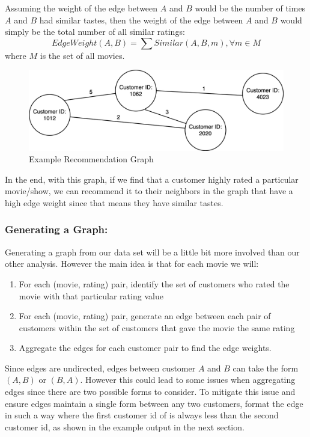 \documentclass{article}
\begin{document}
\noindent Assuming the weight of the edge between $A$ and $B$ would be the number of times $A$ and $B$ had similar tastes, then the weight of the edge between $A$ and $B$ would simply be the total number of all similar ratings:
\vspace{0.1cm}
$$EdgeWeight(A,B) = \sum Similar(A,B,m), \forall m \in M$$
\vspace{0.1cm}
where $M$ is the set of all movies.\\

\begin{figure}[hbt!]
\vspace{-0.0cm}
\centering
\includegraphics[width=12cm]{images/recgraph.png}
\vspace{-0.0cm}
\caption{Example Recommendation Graph}
\label{fig:recgraph}
\end{figure}



\noindent In the end, with this graph, if we find that a customer highly rated a particular movie/show, we can recommend it to their neighbors in the graph that have a high edge weight since that means they have similar tastes. 



\subsubsection*{Generating a Graph:}
Generating a graph from our data set will be a little bit more involved than our other analysis. However the main idea is that for each movie we will:
\begin{enumerate}
    \item For each (movie, rating) pair, identify the set of customers who rated the movie with that particular rating value
    \item For each (movie, rating) pair, generate an edge between each pair of customers within the set of customers that gave the movie the same rating
    \item Aggregate the edges for each customer pair to find the edge weights. 
\end{enumerate}
\begin{info}
Since edges are undirected, edges between customer $A$ and $B$ can take the form $(A,B)$ or $(B,A)$. However this could lead to some issues when aggregating edges since there are two possible forms to consider. To mitigate this issue and ensure edges maintain a single form between any two customers, format the edge in such a way where the first customer id of is always less than the second customer id, as shown in the example output in the next section. 
\end{info}
\end{document}
